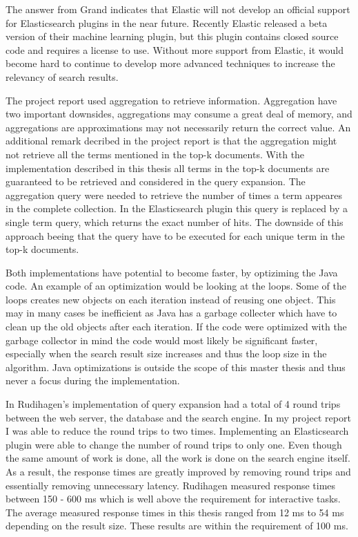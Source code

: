 The answer from Grand indicates that Elastic will not develop an official support for Elasticsearch plugins in the near future.
Recently Elastic released a beta version of their machine learning plugin,
but this plugin contains closed source code and requires a license to use.
Without more support from Elastic,
it would become hard to continue to develop more advanced techniques to increase the relevancy of search results.

The project report \cite{project-report} used aggregation to retrieve information.
Aggregation have two important downsides,
aggregations may consume a great deal of memory,
and aggregations are approximations may not necessarily return the correct value.
An additional remark decribed in the project report is that the aggregation might not retrieve all the terms mentioned in the top-k documents.
With the implementation described in this thesis all terms in the top-k documents are guaranteed to be retrieved and considered in the query expansion.
The aggregation query were needed to retrieve the number of times a term appeares in the complete collection.
In the Elasticsearch plugin this query is replaced by a single term query,
which returns the exact number of hits.
The downside of this approach beeing that the query have to be executed for each unique term in the top-k documents.

Both implementations have potential to become faster, by optiziming the Java code.
An example of an optimization would be looking at the loops.
Some of the loops creates new objects on each iteration instead of reusing one object.
This may in many cases be inefficient as Java has a garbage collecter which have to clean up the old objects after each iteration.
If the code were optimized with the garbage collector in mind the code would most likely be significant faster,
especially when the search result size increases and thus the loop size in the algorithm.
Java optimizations is outside the scope of this master thesis and thus never a focus during the implementation.

In Rudihagen's implementation of query expansion had a total of 4 round trips between the web server, the database and the search engine.
In my project report I was able to reduce the round trips to two times.
Implementing an Elasticsearch plugin were able to change the number of round trips to only one.
Even though the same amount of work is done, all the work is done on the search engine itself.
As a result,
the response times are greatly improved by removing round trips and essentially removing unnecessary latency.
Rudihagen measured response times between 150 - 600 ms which is well above the requirement for interactive tasks.
The average measured response times in this thesis ranged from 12 ms to 54 ms depending on the result size.
These results are within the requirement of 100 ms.



